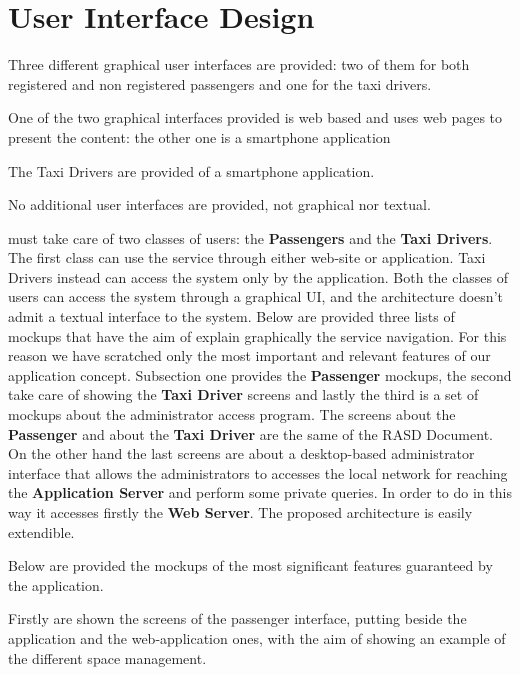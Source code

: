 \section{User Interface Design}
Three different graphical user interfaces are provided: two of them for both registered and non registered passengers and one for the taxi drivers.\par
One of the two graphical interfaces provided is web based and uses web pages to present the content: the other one is a smartphone application\par
The Taxi Drivers are provided of a smartphone application.\par
No additional user interfaces are provided, not graphical nor textual.

\myTaxiService{} must take care of two classes of users: the \textbf{Passengers} and the \textbf{Taxi Drivers}. The first class can use the service through either web-site or application. Taxi Drivers instead can access the system only by the application.
Both the classes of users can access the system through a graphical UI, and the architecture doesn't admit a textual interface to the system.
Below are provided three lists of mockups that have the aim of explain graphically the service navigation. For this reason we have scratched only the most important and relevant features of our application concept.
Subsection one provides the \textbf{Passenger} mockups, the second take care of showing the \textbf{Taxi Driver} screens and lastly the third is a set of mockups about the administrator access program.
The screens about the \textbf{Passenger} and about the \textbf{Taxi Driver} are the same of the RASD Document.
On the other hand the last screens are about a desktop-based administrator interface that allows the administrators to accesses the local network for reaching the \textbf{Application Server} and perform some private queries. In order to do in this way it accesses firstly the \textbf{Web Server}.
The proposed architecture is easily extendible.

Below are provided the mockups of the  most significant features guaranteed by the application.\par
Firstly are shown the screens of the passenger interface, putting beside the application and the web-application ones, with the aim of showing an example of the different space management. \par 
\newpage
